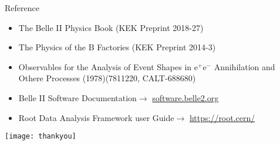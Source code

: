 \documentclass[12pt]{beamer}
\begin{document}

%	
%	
%	
%	

%
%
	


\appendix
\begin{frame}{Reference}
	\begin{scriptsize}
		\begin{itemize}
			\item The Belle II Physics Book (KEK Preprint 2018-27)
			\item The Physics of the B Factories (KEK Preprint 2014-3)
			\item Observables for the Analysis of Event Shapes in e$^{+}$e$^{-}$ Annihilation and Othere Processes (1978)(7811220, CALT-688680)
			\item Belle II Software Documentation$\rightarrow$ \href{http://software.belle2.org}{software.belle2.org}
			\item Root Data Analysis Framework user Guide$\rightarrow$ \href{https://root.cern/}{https://root.cern/}
		\end{itemize}
	\end{scriptsize}
\end{frame}

\begin{frame}{}                                                                           
	\texttt{[image: thankyou]}
\end{frame}


\begin{frame}{}                                                                           

\end{frame}
\begin{frame}{}                                                                           
\end{frame}
\end{document}
